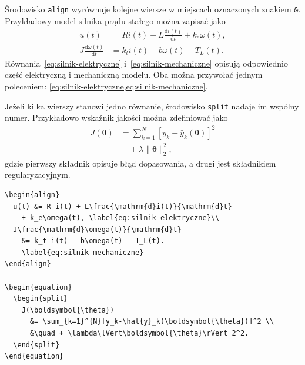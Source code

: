 \section{}

Środowisko \texttt{align} wyrównuje kolejne wiersze w miejscach oznaczonych znakiem
\verb|&|. Przykładowy model silnika prądu stałego można zapisać jako
\begin{align}
  u(t) &= R i(t) + L\frac{\mathrm{d}i(t)}{\mathrm{d}t} + k_e\omega(t),
    \label{eq:silnik-elektryczne}\\
  J\frac{\mathrm{d}\omega(t)}{\mathrm{d}t}
    &= k_t i(t) - b\omega(t) - T_L(t).
    \label{eq:silnik-mechaniczne}
\end{align}
Równania~\ref{eq:silnik-elektryczne} i~\ref{eq:silnik-mechaniczne} opisują odpowiednio
część elektryczną i mechaniczną modelu. Oba można przywołać jednym poleceniem:
\cref{eq:silnik-elektryczne,eq:silnik-mechaniczne}.

Jeżeli kilka wierszy stanowi jedno równanie, środowisko \texttt{split} nadaje im wspólny
numer. Przykładowo wskaźnik jakości można zdefiniować jako
\begin{equation}
  \begin{split}
    J(\boldsymbol{\theta})
      &= \sum_{k=1}^{N}\left[y_k-\hat{y}_k(\boldsymbol{\theta})\right]^2 \\
      &\quad + \lambda\lVert\boldsymbol{\theta}\rVert_2^2,
  \end{split}
  \label{eq:wskaznik-jakosci}
\end{equation}
gdzie pierwszy składnik opisuje błąd dopasowania, a drugi jest składnikiem
regularyzacyjnym.

\begin{lstlisting}[style=thesis,caption={Kod równań wielowierszowych},label={lst:rownania-wielowierszowe}]
\begin{align}
  u(t) &= R i(t) + L\frac{\mathrm{d}i(t)}{\mathrm{d}t}
    + k_e\omega(t), \label{eq:silnik-elektryczne}\\
  J\frac{\mathrm{d}\omega(t)}{\mathrm{d}t}
    &= k_t i(t) - b\omega(t) - T_L(t).
    \label{eq:silnik-mechaniczne}
\end{align}

\begin{equation}
  \begin{split}
    J(\boldsymbol{\theta})
      &= \sum_{k=1}^{N}[y_k-\hat{y}_k(\boldsymbol{\theta})]^2 \\
      &\quad + \lambda\lVert\boldsymbol{\theta}\rVert_2^2.
  \end{split}
\end{equation}
\end{lstlisting}

